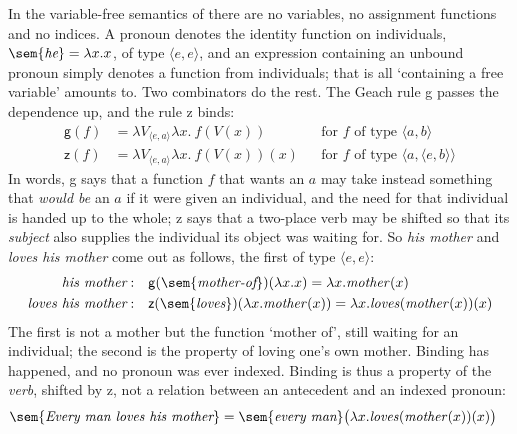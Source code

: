 \documentclass[
  layout=tufte,           %
  twoside=false, open=any,
  font=pagella,
  chapterprefix=false,
  numbers=noendperiod,    %
  headings=optiontohead,  %
  parskip=half-,          %
  colorlinks=true,
  examples=gb4e,
  minsyn=true,            %
  bib=natbib, bibstyle=glossa, bibfile=keio,
  greek=false,
]{gtbook}
\begin{document}
\begin{excursus*}
  In the variable-free semantics of \citet{Jacobson1999} there are no variables,
  no assignment functions and no indices. A pronoun denotes the identity
  function on individuals, $\sem{\textit{he}} = \lambda x.x$, of type
  $\langle e,e\rangle$, and an expression containing an unbound pronoun simply
  denotes a function from individuals; that is all `containing a free variable'
  amounts to. Two combinators do the rest. The Geach rule \textsf{g} passes the
  dependence up, and the rule \textsf{z} binds:
\begin{align*}
\mathsf{g}(f) &= \lambda V_{\langle e,a\rangle}\lambda x.\ f(V(x)) && \text{for $f$ of type $\langle a,b\rangle$}\\
\mathsf{z}(f) &= \lambda V_{\langle e,a\rangle}\lambda x.\ f(V(x))(x) && \text{for $f$ of type $\langle a,\langle e,b\rangle\rangle$}
\end{align*}
In words, \textsf{g} says that a function $f$ that wants an $a$ may take instead something that \emph{would be} an $a$ if it were given an individual, and the need for that individual is handed up to the whole; \textsf{z} says that a two-place verb may be shifted so that its \emph{subject} also supplies the individual its object was waiting for. So \textit{his mother} and \textit{loves his mother} come out as follows, the first of type $\langle e,e\rangle$:
\begin{align*}
\textit{his mother}: &\quad \mathsf{g}(\sem{\textit{mother-of}})(\lambda x.x) = \lambda x.\mathit{mother}(x)\\
\textit{loves his mother}: &\quad \mathsf{z}(\sem{\textit{loves}})(\lambda x.\mathit{mother}(x)) = \lambda x.\mathit{loves}(\mathit{mother}(x))(x)
\end{align*}
The first is not a mother but the function `mother of', still waiting for an individual; the second is the property of loving one's own mother. Binding has happened, and no pronoun was ever indexed. Binding is thus a property of the \emph{verb}, shifted by \textsf{z}, not a relation between an antecedent and an indexed pronoun:
\begin{align*}
\sem{\textit{Every man loves his mother}} &= \sem{\textit{every man}}\bigl(\lambda x.\mathit{loves}(\mathit{mother}(x))(x)\bigr)
\end{align*}


\end{excursus*}
\end{document}
